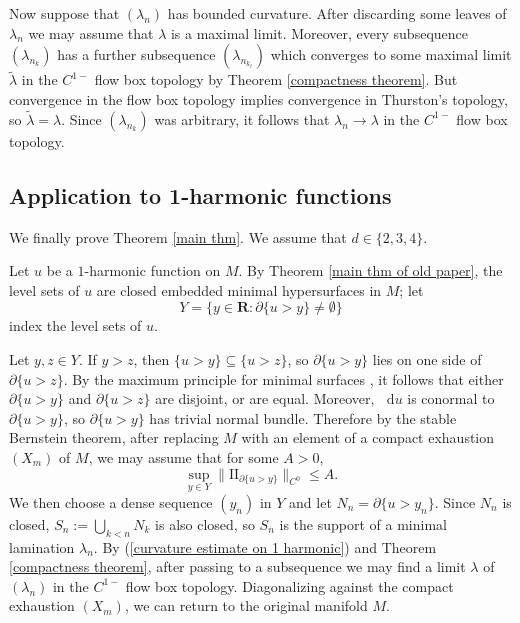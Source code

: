 \documentclass[reqno,11pt]{amsart}
\newcommand{\RR}{\mathbf{R}}
\newcommand*\dif{\mathop{}\!\mathrm{d}}
\newcommand{\Two}{\mathrm{I\!I}}
\theoremstyle{definition}
\numberwithin{equation}{section}
\begin{document}
Now suppose that $(\lambda_n)$ has bounded curvature.
After discarding some leaves of $\lambda_n$ we may assume that $\lambda$ is a maximal limit.
Moreover, every subsequence $(\lambda_{n_k})$ has a further subsequence $(\lambda_{n_{k_\ell}})$ which converges to some maximal limit $\tilde \lambda$ in the $C^{1-}$ flow box topology by Theorem \ref{compactness theorem}.
But convergence in the flow box topology implies convergence in Thurston's topology, so $\tilde \lambda = \lambda$.
Since $(\lambda_{n_k})$ was arbitrary, it follows that $\lambda_n \to \lambda$ in the $C^{1-}$ flow box topology.


\subsection{Application to 1-harmonic functions}
We finally prove Theorem \ref{main thm}.
We assume that $d \in \{2, 3, 4\}$.

Let $u$ be a $1$-harmonic function on $M$.
By Theorem \ref{main thm of old paper}, the level sets of $u$ are closed embedded minimal hypersurfaces in $M$; let
$$Y = \{y \in \RR: \partial \{u > y\} \neq \emptyset\}$$
index the level sets of $u$.

Let $y, z \in Y$. If $y > z$, then $\{u > y\} \subseteq \{u > z\}$, so $\partial \{u > y\}$ lies on one side of $\partial \{u > z\}$.
By the maximum principle for minimal surfaces \cite[Corollary 1.28]{colding2011course}, it follows that either $\partial \{u > y\}$ and $\partial \{u > z\}$ are disjoint, or are equal.
Moreover, $\dif u$ is conormal to $\partial \{u > y\}$, so $\partial \{u > y\}$ has trivial normal bundle.
Therefore by the stable Bernstein theorem, after replacing $M$ with an element of a compact exhaustion $(X_m)$ of $M$, we may assume that for some $A > 0$,
\begin{equation}\label{curvature estimate on 1 harmonic}
	\sup_{y \in Y} \|\Two_{\partial \{u > y\}}\|_{C^0} \leq A.
\end{equation}
We then choose a dense sequence $(y_n)$ in $Y$ and let $N_n = \partial \{u > y_n\}$.
Since $N_n$ is closed, $S_n := \bigcup_{k < n} N_k$ is also closed, so $S_n$ is the support of a minimal lamination $\lambda_n$.
By (\ref{curvature estimate on 1 harmonic}) and Theorem \ref{compactness theorem}, after passing to a subsequence we may find a limit $\lambda$ of $(\lambda_n)$ in the $C^{1-}$ flow box topology.
Diagonalizing against the compact exhaustion $(X_m)$, we can return to the original manifold $M$.
\end{document}
